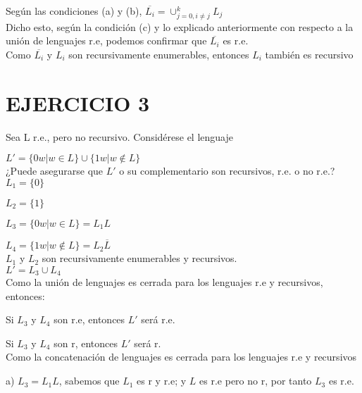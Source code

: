 \documentclass{article}
\begin{document}
Según las condiciones (a) y (b), $\overline{L_{i}} = \cup_{j=0, i\neq j}^{k} L_{j}$\\

Dicho esto, según la condición (c) y lo explicado anteriormente con respecto a la unión de lenguajes r.e, podemos confirmar que $\overline{L_{i}}$ es r.e.\\

Como $\overline{L_{i}}$ y $L_{i}$ son recursivamente enumerables, entonces $L_{i}$ también es recursivo

\newpage

\section{EJERCICIO 3}

Sea L r.e., pero no recursivo. Considérese el lenguaje

$L'= \{0w | w \in L\} \cup \{1w | w \notin L\}$\\

¿Puede asegurarse que $L'$ o su complementario son recursivos, r.e. o no r.e.?\\

$L_{1} = \{0\}$

$L_{2} = \{1\}$

$L_{3} = \{0w|w\in L\} = L_{1}L$

$L_{4} = \{1w|w\notin L\} = L_{2}\overline{L}$\\

$L_{1}$ y $L_{2}$ son recursivamente enumerables y recursivos.\\

$L'= L_{3} \cup L_{4}$\\


Como la unión de lenguajes es cerrada para los lenguajes r.e y recursivos, entonces:

\hspace{1cm} Si $L_{3}$ y $L_{4}$ son r.e, entonces $L'$ será r.e.

\hspace{1cm} Si $L_{3}$ y $L_{4}$ son r, entonces $L'$ será r.\\

Como la concatenación de lenguajes es cerrada para los lenguajes r.e y recursivos

\hspace{1cm} a) $L_{3} = L_{1}L$, sabemos que $L_{1}$ es r y r.e; y $L$ es r.e pero no r, por tanto $L_{3}$ es r.e.\\
\end{document}
